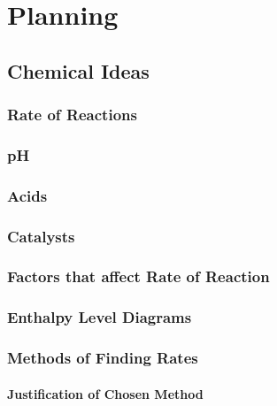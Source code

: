 \chapter {Planning}

\section {Chemical Ideas}

\subsection{Rate of Reactions}



\subsection{pH}



\subsection{Acids}



\subsection{Catalysts}




\subsection{Factors that affect Rate of Reaction}



\subsection{Enthalpy Level Diagrams}



\subsection{Methods of Finding Rates}



\subsubsection{Justification of Chosen Method}



